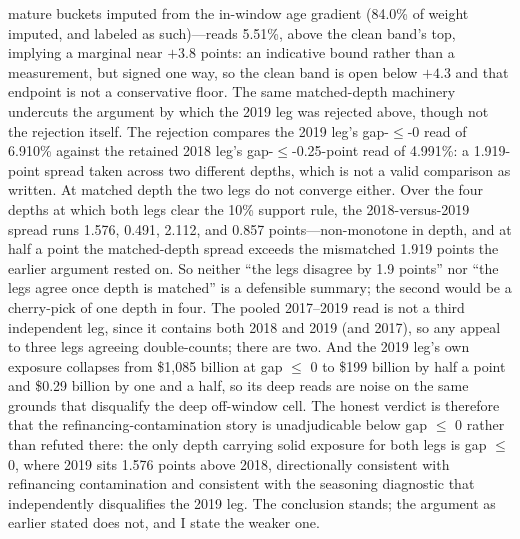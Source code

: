 \documentclass[12pt]{article}
\begin{document}
mature buckets imputed from the in-window age gradient (84.0\% of weight imputed, and labeled as such)---reads 5.51\%, above the clean band's top, implying a marginal near $+3.8$ points: an indicative bound rather than a measurement, but signed one way, so the clean band is open below $+4.3$ and that endpoint is not a conservative floor.
The same matched-depth machinery undercuts the argument by which the 2019 leg was rejected above, though not the rejection itself. The rejection compares the 2019 leg's gap-$\leq$-0 read of 6.910\% against the retained 2018 leg's gap-$\leq$-0.25-point read of 4.991\%: a 1.919-point spread taken across two different depths, which is not a valid comparison as written. At matched depth the two legs do not converge either. Over the four depths at which both legs clear the 10\% support rule, the 2018-versus-2019 spread runs 1.576, 0.491, 2.112, and 0.857 points---non-monotone in depth, and at half a point the matched-depth spread exceeds the mismatched 1.919 points the earlier argument rested on. So neither ``the legs disagree by 1.9 points'' nor ``the legs agree once depth is matched'' is a defensible summary; the second would be a cherry-pick of one depth in four. The pooled 2017--2019 read is not a third independent leg, since it contains both 2018 and 2019 (and 2017), so any appeal to three legs agreeing double-counts; there are two. And the 2019 leg's own exposure collapses from \$1{,}085 billion at gap $\leq$ 0 to \$199 billion by half a point and \$0.29 billion by one and a half, so its deep reads are noise on the same grounds that disqualify the deep off-window cell. The honest verdict is therefore that the refinancing-contamination story is unadjudicable below gap $\leq$ 0 rather than refuted there: the only depth carrying solid exposure for both legs is gap $\leq$ 0, where 2019 sits 1.576 points above 2018, directionally consistent with refinancing contamination and consistent with the seasoning diagnostic that independently disqualifies the 2019 leg. The conclusion stands; the argument as earlier stated does not, and I state the weaker one.
\end{document}
